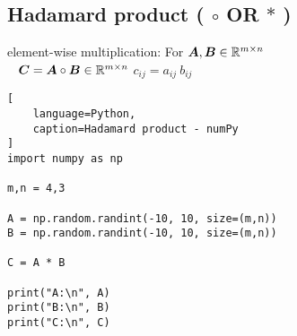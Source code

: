 \subsection{Hadamard product ( $\circ$ OR $\ast$ ) \cite{mfml/book/mml/Deisenroth-Faisal-Ong}}

element-wise multiplication: For $\bm{A}, \bm{B} \in \mathbb{R}^{m\times n}$
\\
\ 
\hfill
$
    \bm{C} = \bm{A} \circ \bm{B} \in \mathbb{R}^{m\times n}
$
\hfill
$
    c_{ij} = a_{ij}\ b_{ij}
$
\hfill
\ 













\begin{lstlisting}[
    language=Python,
    caption=Hadamard product - numPy
]
import numpy as np

m,n = 4,3

A = np.random.randint(-10, 10, size=(m,n))
B = np.random.randint(-10, 10, size=(m,n))

C = A * B

print("A:\n", A)
print("B:\n", B)
print("C:\n", C)
\end{lstlisting}










